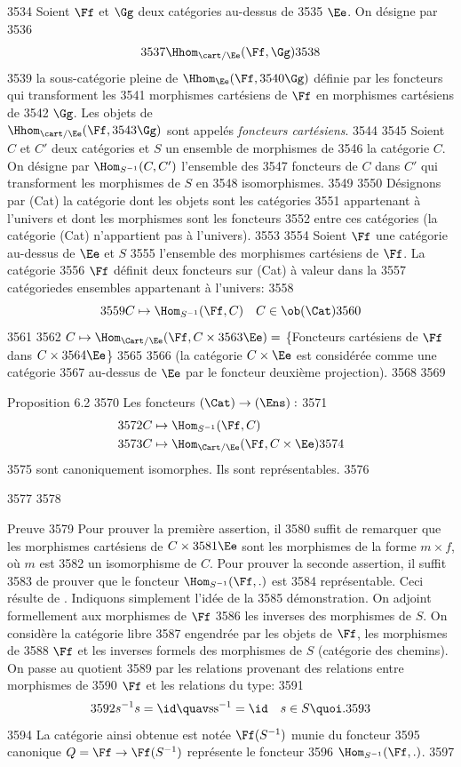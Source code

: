   3534	Soient $\Ff$ et $\Gg$ deux catégories au-dessus de
  3535	$\Ee$. On désigne par
  3536	$$
  3537	\Hhom_{\cart/\Ee} (\Ff, \Gg)
  3538	$$
  3539	la sous-catégorie pleine de $\Hhom_{\Ee} (\Ff,
  3540	\Gg)$ définie par les foncteurs qui transforment les
  3541	morphismes cartésiens de $\Ff$ en morphismes cartésiens de
  3542	$\Gg$. Les objets de \\ $\Hhom_{\cart/\Ee} (\Ff,
  3543	\Gg)$ sont appelés \emph{foncteurs cartésiens}.
  3544	
  3545	Soient $C$ et $C'$ deux catégories et $S$ un ensemble de morphismes de
  3546	la catégorie $C$. On désigne par $\Hom_{S^{-1}} (C, C')$ l'ensemble des
  3547	foncteurs de $C$ dans $C'$ qui transforment les morphismes de $S$ en
  3548	isomorphismes.
  3549	
  3550	Désignons par (Cat) la catégorie dont les objets sont les catégories
  3551	appartenant à l'univers et dont les morphismes sont les foncteurs
  3552	entre ces catégories (la catégorie (Cat) n'appartient pas à l'univers).
  3553	
  3554	Soient $\Ff$  une catégorie au-dessus de $\Ee$ et $S$
  3555	l'ensemble des morphismes cartésiens de $\Ff$. La catégorie
  3556	$\Ff$ définit deux foncteurs sur (Cat) à valeur dans la
  3557	catégorie\pageoriginale des ensembles appartenant à l'univers:
  3558	$$
  3559	C \mapsto \Hom_{S^{-1}} (\Ff, C)\quad C \in \ob (\Cat)
  3560	$$
  3561	
  3562	$C \mapsto \Hom_{\Cart /\Ee} (\Ff, C  \times
  3563	\Ee) =$ \{Foncteurs cartésiens de $\Ff$ dans $C \times
  3564	  \Ee$\}
  3565	
  3566	(la catégorie $C\times \Ee$ est considérée comme une catégorie
  3567	au-dessus de $\Ee$ par le foncteur deuxième projection).
  3568	
  3569	\begin{enonce*}{Proposition 6.2}
  3570	Les foncteurs $(\Cat) \to (\Ens) :$
  3571	\begin{align*}
  3572	C &\mapsto \Hom_{S^{-1}} (\Ff, C)\\
  3573	C &\mapsto \Hom_{\Cart/\Ee} (\Ff, C \times \Ee)
  3574	\end{align*}
  3575	sont canoniquement isomorphes. Ils sont représentables.
  3576	\end{enonce*}
  3577	
  3578	\begin{enonce*}[remark]{Preuve}
  3579	Pour prouver la première assertion, il
  3580	suffit de remarquer que les morphismes cartésiens de $C \times
  3581	\Ee$ sont les morphismes de la forme $m \times f$, où $m$ est
  3582	un isomorphisme de $C$. Pour prouver la seconde assertion, il suffit
  3583	de prouver que le foncteur $\Hom_{S^{-1}} (\Ff, .)$ est
  3584	représentable. Ceci résulte de \cite{1}. Indiquons simplement l'idée de la
  3585	démonstration. On adjoint formellement aux morphismes de $\Ff$
  3586	les inverses des morphismes de $S$. On considère la catégorie libre
  3587	engendrée par les objets de $\Ff$, les morphismes de
  3588	$\Ff$ et les inverses formels des morphismes de $S$ (catégorie des chemins). On passe au quotient
  3589	par les relations provenant des relations entre morphismes de
  3590	$\Ff$ et les relations du type:
  3591	$$
  3592	s^{-1} s = \id\quav \text{ss}^{-1} = \id\quad  s \in S{\quoi}.
  3593	$$
  3594	La catégorie ainsi obtenue est notée $\Ff(S^{-1})$ munie du foncteur
  3595	canonique $Q = \Ff \to \Ff(S^{-1})$ représente le foncteur
  3596	$\Hom_{S^{-1}} (\Ff, .)$.
  3597	\end{enonce*}
